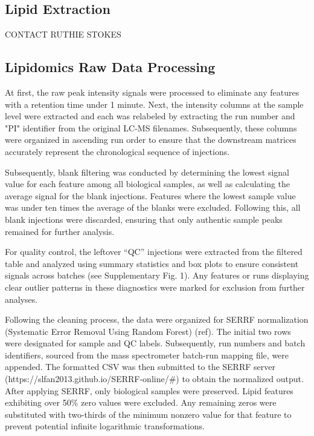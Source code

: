 \documentclass[10pt,letterpaper]{article}
\begin{document}
\subsection*{Lipid Extraction}
CONTACT RUTHIE STOKES



\subsection*{Lipidomics  Raw Data Processing}
At first, the raw peak intensity signals were processed to eliminate any features with a retention time under 1 minute. Next, the intensity columns at the sample level were extracted and each was relabeled by extracting the run number and "PI" identifier from the original LC-MS filenames. Subsequently, these columns were organized in ascending run order to ensure that the downstream matrices accurately represent the chronological sequence of injections.

Subsequently, blank filtering was conducted by determining the lowest signal value for each feature among all biological samples, as well as calculating the average signal for the blank injections. Features where the lowest sample value was under ten times the average of the blanks were excluded. Following this, all blank injections were discarded, ensuring that only authentic sample peaks remained for further analysis.

For quality control, the leftover “QC” injections were extracted from the filtered table and analyzed using summary statistics and box plots to ensure consistent signals across batches (see Supplementary Fig. 1). Any features or runs displaying clear outlier patterns in these diagnostics were marked for exclusion from further analyses.

Following the cleaning process, the data were organized for SERRF normalization (Systematic Error Removal Using Random Forest) (ref). The initial two rows were designated for sample and QC labels. Subsequently, run numbers and batch identifiers, sourced from the mass spectrometer batch-run mapping file, were appended. The formatted CSV was then submitted to the SERRF server (https://slfan2013.github.io/SERRF-online/\#) to obtain the normalized output. After applying SERRF, only biological samples were preserved. Lipid features exhibiting over 50\% zero values were excluded. Any remaining zeros were substituted with two-thirds of the minimum nonzero value for that feature to prevent potential infinite logarithmic transformations.
\end{document}
